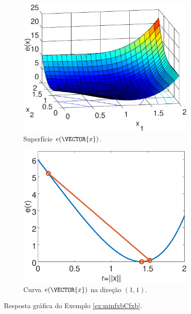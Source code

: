 \begin{figure}[h!]
     \centering
     \begin{subfigure}[b]{0.49\textwidth}
         \centering
         \includegraphics[width=0.98\textwidth]{chapters/minimization-fx/mfiles/fx1/surfcfx.eps}
         \caption{Superfície $e(\VECTOR{x})$. }
         \label{fig:ex:minfxbCfxb:a}
     \end{subfigure}
     \hfill
     \begin{subfigure}[b]{0.49\textwidth}
         \centering
         \includegraphics[width=0.98\textwidth]{chapters/minimization-fx/mfiles/fx1/plotfx.eps}
         \caption{Curva $e(\VECTOR{x})$ na direção $(1,1)$.}
         \label{fig:ex:minfxbCfxb:b}
     \end{subfigure}
        \caption{Resposta gráfica do Exemplo \ref{ex:minfxbCfxb}. }
        \label{fig:ex:minfxbCfxb}
\end{figure}


